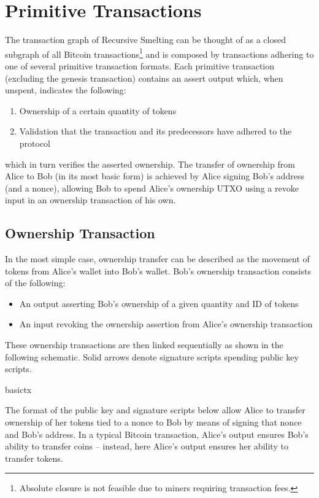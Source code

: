 \documentclass[9pt,oneside]{amsart}
\begin{document}
\section{Primitive Transactions}\label{sec:primtrans}
The transaction graph of Recursive Smelting can be thought of as a closed subgraph of all Bitcoin transactions\footnote{Absolute closure is not feasible due to miners requiring transaction fees.} and is composed by transactions adhering to one of several primitive transaction formats. Each primitive transaction (excluding the genesis transaction) contains an assert output which, when unspent, indicates the following:
\begin{enumerate}
	\item Ownership of a certain quantity of tokens
	\item Validation that the transaction and its predecessors have adhered to the protocol
\end{enumerate}
which in turn verifies the asserted ownership. The transfer of ownership from Alice to Bob (in its most basic form) is achieved by Alice signing Bob's address (and a nonce), allowing Bob to spend Alice's ownership UTXO using a revoke input in an ownership transaction of his own.

\subsection{Ownership Transaction}\label{subsec:basicownershiptx}
In the most simple case, ownership transfer can be described as the movement of tokens from Alice's wallet into Bob's wallet. Bob's ownership transaction consists of the following:
\begin{itemize}
    \item An output asserting Bob's ownership of a given quantity and ID of tokens
    \item An input revoking the ownership assertion from Alice's ownership transaction
\end{itemize}

These ownership transactions are then linked sequentially as shown in the following schematic. Solid arrows denote signature scripts spending public key scripts.
\begin{center}
{basictx}
\end{center}

The format of the public key and signature scripts below allow Alice to transfer ownership of her tokens tied to a nonce to Bob by means of signing that nonce and Bob's address. In a typical Bitcoin transaction, Alice's output ensures Bob's ability to transfer coins -- instead, here Alice's output ensures her ability to transfer tokens.
\end{document}
